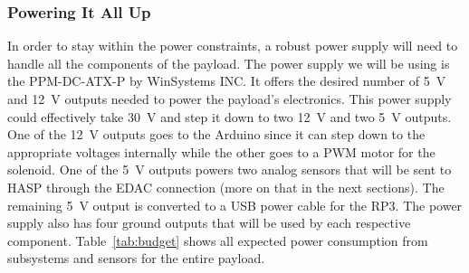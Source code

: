 \subsubsection{Powering It All Up}

In order to stay within the power constraints, a robust power supply will need to  handle all the components of the payload.  The power supply we will be using is the PPM-DC-ATX-P by WinSystems INC.  It offers the desired number of \SI{+5}{\volt} and \SI{+12}{\volt} outputs needed to power the payload's electronics.  This power supply could effectively take \SI{+30}{\volt} and step it down to two \SI{+12}{\volt} and two \SI{+5 }{\volt} outputs.  One of the \SI{+12}{\volt} outputs goes to the Arduino since it can step down to the appropriate voltages internally while the other goes to a PWM motor for the solenoid.  One of the \SI{+5 }{\volt} outputs powers two analog sensors that will be sent to HASP through the EDAC connection (more on that in the next sections).  The remaining \SI{+5 }{\volt} output is converted to a USB power cable for the RP3.  The power supply also has four ground outputs that will be used by each respective component. Table~\ref{tab:budget} shows all expected power consumption from subsystems and sensors for the entire payload.
